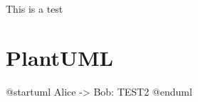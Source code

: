 \documentclass{article}
\begin{document}
    This is a test
    \section{PlantUML}
        \begin{plantuml}
          @startuml
          Alice -> Bob: TEST2
          @enduml
        \end{plantuml}
\end{document}
